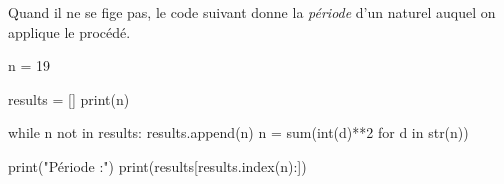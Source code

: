 Quand il ne se fige pas, le code suivant donne la \textit{\og période \fg} d'un naturel auquel on applique le procédé.

\begin{rawcode}
n = 19

results = []
print(n)

while n not in results:
    results.append(n)
    n = sum(int(d)**2 for d in str(n))

print("Période :")
print(results[results.index(n):])
\end{rawcode}
